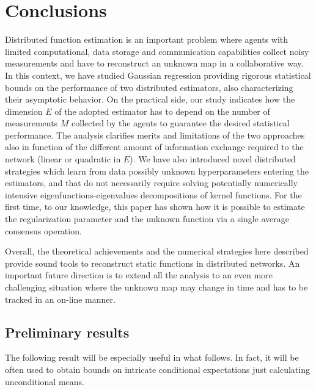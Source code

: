 \documentclass[10pt,twocolumn,twoside]{IEEEtran}					%
\theoremstyle	{plain}
\begin{document}
\section{Conclusions}
\label{Conclusions}

Distributed function estimation is an important problem where agents with limited computational, data storage and communication capabilities collect noisy measurements and have to reconstruct an unknown map in a collaborative way. In this context, we have studied Gaussian regression providing rigorous statistical bounds on the performance of two distributed estimators, also characterizing their asymptotic behavior. On the practical side, our study indicates how the dimension $E$ of the adopted estimator has to depend on the number of measurements $M$ collected by the agents to guarantee the desired statistical performance. The analysis clarifies merits and limitations of the two approaches also in function of the different amount of information exchange required to the network (linear or quadratic in $E$). We have also introduced novel distributed strategies which learn from data possibly unknown hyperparameters entering the estimators, and that do not necessarily require solving potentially numerically intensive eigenfunctions-eigenvalues decompositions of kernel functions. For the first time, to our knowledge, this paper has shown how it is possible to estimate the regularization parameter and the unknown function via a single average consensus operation.

Overall, the theoretical achievements and the numerical strategies here described provide sound tools to reconstruct static functions in distributed networks. An important future direction is to extend all the analysis to an even more challenging situation where the unknown map may change in time and has to be tracked in an on-line manner. 



\appendix

\subsection{Preliminary results}
\label{sec:ancillary_results_on_the_computation_of_conditional_expectations}

The following result will be especially useful in what follows.  In fact, it will be often used to obtain bounds on intricate conditional expectations just calculating unconditional means.
\end{document}
